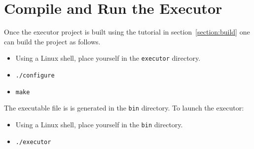 
\section{Compile and Run the Executor}
Once the executor project is built using the tutorial in section~\ref{section:build} one can build the project as follows.

\begin{itemize}
\item Using a Linux shell, place yourself in the \texttt{executor} directory.
\item \texttt{./configure}
\item \texttt{make}
\end{itemize}

The executable file is  is generated in the \texttt{bin} directory. To launch the executor:
\begin{itemize}
\item Using a Linux shell, place yourself in the \texttt{bin} directory.
\item \texttt{./executor}
\end{itemize}